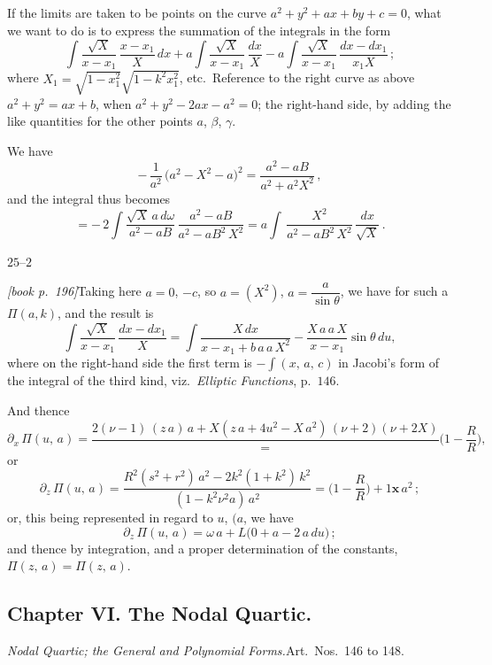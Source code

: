 \documentclass[11pt,a4paper]{article}
\begin{document}
If the limits are taken to be points on the curve $a^2 + y^2 + ax + by + c = 0$, what we want to do is to express the summation of the integrals in the form
\[
\int\frac{\sqrt{X}}{x - x_1}\,\frac{x - x_1}{X}\,dx + a\int\frac{\sqrt{X}}{x - x_1}\,\frac{dx}{X} - a\int\frac{\sqrt{X}}{x - x_1}\,\frac{dx - dx_1}{x_1 X}\,;
\]
where $X_1 = \sqrt{1 - x_1^2}\sqrt{1 - k^2 x_1^2}$, etc.\ Reference to the right curve as above $a^2 + y^2 = ax + b$, when $a^2 + y^2 - 2ax - a^2 = 0$; the right-hand side, by adding the like quantities for the other points $a$, $\beta$, $\gamma$.

We have
\[
-\,\frac{1}{a^2}\,\bigl(a^2 - X^2 - a\bigr)^2 = \dfrac{a^2 - aB}{a^2 + a^2 X^2}\,,
\]
and the integral thus becomes
\[
= -\,2\!\int\frac{\sqrt{X}\,a\,d\omega}{a^2 - aB}\,\frac{a^2 - aB}{a^2 - aB^2\,X^2} = a\!\int\,\frac{X^2}{a^2 - aB^2\,X^2}\,\frac{dx}{\sqrt{X}}\,.
\]

\hfill $25$--$2$

\medskip\noindent\textit{[book p.~196]}\quad Taking here $a = 0$, $-c$, so $a = (X^2)$, $a = \dfrac{a}{\sin\theta}$, we have for such a $\Pi(a,k)$, and the result is
\[
\int\frac{\sqrt{X}}{x - x_1}\,\frac{dx - dx_1}{X} = \int\frac{X\,dx}{x - x_1 + b\,a\,a\,X^2} - \frac{X\,a\,a\,X}{x - x_1}\sin\theta\,du,
\]
where on the right-hand side the first term is $-\int(x,\,a,\,c)$ in Jacobi's form of the integral of the third kind, viz.\ \textit{Elliptic Functions}, p.\ $146$.

And thence
\[
\partial_x\,\Pi(u,\,a) = \frac{2(\nu - 1)\,(z\,a)\,a + X(z\,a + 4u^2 - X\,a^2)\,(\nu + 2)(\nu + 2X)} = \bigl(1 - \frac{R}{R}\bigr),
\]
or
\[
\partial_z\,\Pi(u,\,a) = \frac{R^2 (s^2 + r^2)\,a^2 - 2k^2 (1 + k^2)\,k^2}{(1 - k^2 \nu^2 a)\,a^2} = \bigl(1 - \frac{R}{R}\bigr) + 1\bm{x}\,a^2\,;
\]
or, this being represented in regard to $u$, $\bigl(a$, we have
\[
\partial_z\,\Pi(u,\,a) = \omega\,a + L\bigl(0 + a - 2\,a\,du\bigr)\,;
\]
and thence by integration, and a proper determination of the constants, $\Pi(z,\,a) = \Pi(z,\,a)$.

\subsection*{Chapter VI. The Nodal Quartic.}

\medskip\noindent\textit{Nodal Quartic; the General and Polynomial Forms.}\quad Art.\ Nos.\ 146 to 148.
\end{document}
